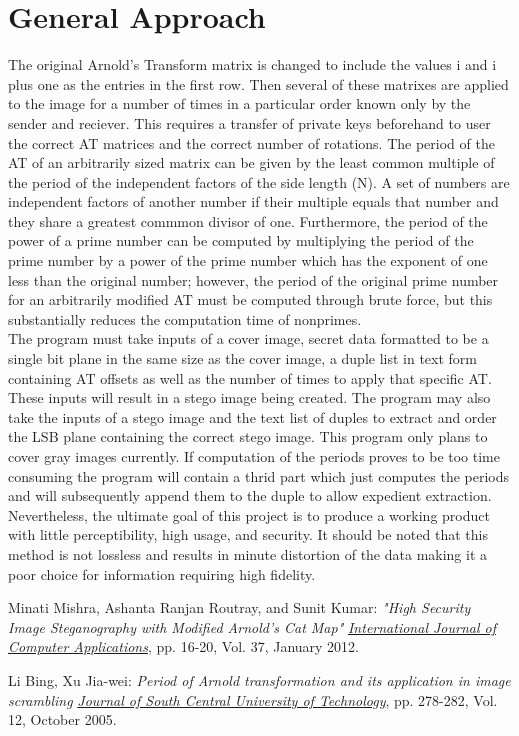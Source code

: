 \documentclass{article}
\begin{document}
\section{General Approach}
\indent \indent The original  Arnold's Transform matrix is changed to include the values i and i plus one as the entries in the first row.
Then several of these matrixes are applied
to the image for a number of times in a particular order known only by the sender and reciever. This requires a transfer of private
keys beforehand to user the correct AT matrices and the correct number of rotations. The period of the AT of an arbitrarily sized
matrix can be given by the least common multiple of the period of the independent factors of the side length (N). A set of numbers
are independent factors of another number if their multiple equals that number and they share a greatest commmon divisor of one. Furthermore,
the period of the power of a prime number can be computed by multiplying the period of the prime number by a power of the prime number which
has the exponent of one less than the original number; however, the period of the original prime number for an arbitrarily modified AT must be
computed through brute force, but this substantially reduces the computation time of nonprimes. \\
\indent
The program must take inputs of a cover image, secret data formatted to be a single bit plane in the same size as the cover image,
a duple list in text form containing AT offsets as well as the number of times to apply that specific AT. These inputs will result in a stego
image being created. The program may also take the inputs of a stego image and the text list of duples to extract and order the LSB plane  containing
the correct stego image. This program only plans to cover gray images currently. If computation of the periods proves to be too time consuming the program
will contain a thrid part which just computes the periods and will subsequently append them to the duple to allow expedient extraction. Nevertheless, the ultimate
goal of this project is to produce a working product with little perceptibility, high usage, and security. It should be noted that this method is not lossless and
results in minute distortion of the data making it a poor choice for information requiring high fidelity.


\begin{thebibliography}{9}
Minati Mishra, Ashanta Ranjan Routray, and Sunit Kumar:
\textit{"High Security Image Steganography with Modified Arnold's Cat Map"}
\textit{\underline{International Journal of Computer Applications}}, pp. 16-20,
Vol. 37, January 2012.

Li Bing, Xu Jia-wei:
\textit{Period of Arnold transformation and its application in image scrambling}
\textit{\underline{Journal of South Central University of Technology}}, pp. 278-282,
Vol. 12, October 2005.

\end{thebibliography}
\end{document}
